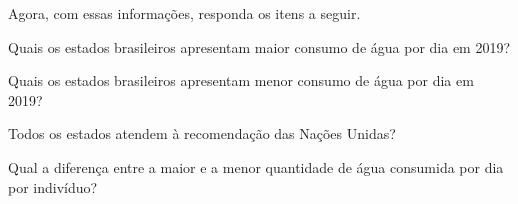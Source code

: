Agora, com essas informações, responda os itens a seguir. 

\begin{escolha}
\item Quais os estados brasileiros apresentam maior consumo de água por dia em 2019?\\

\item Quais os estados brasileiros apresentam menor consumo de água por dia em 2019?\\

\item Todos os estados atendem à recomendação das Nações Unidas?\\

\item Qual a diferença entre a maior e a menor quantidade de água consumida por dia por indivíduo?\\
\end{escolha}

